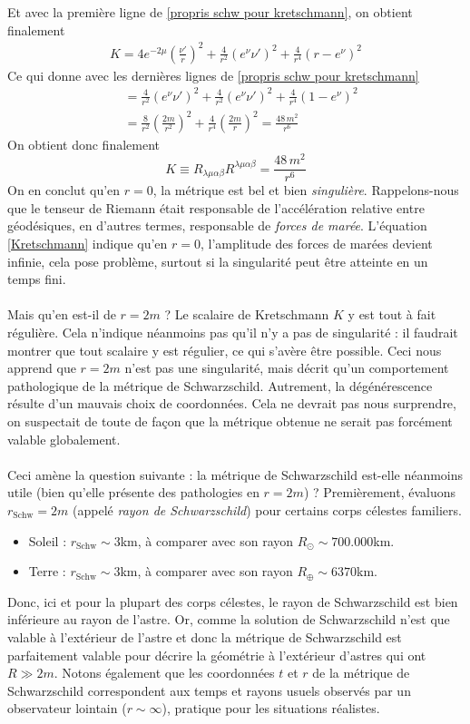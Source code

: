 Et avec la première ligne de \ref{propris schw pour kretschmann}, on obtient finalement
\begin{align*}
    K= 4 e^{-2\mu} \left( \frac{\nu'}{r} \right)^2 + \frac{4}{r^2} (e^{\nu} \nu')^2 + \frac{4}{r^4} (r - e^{\nu})^2
\end{align*}
Ce qui donne avec les dernières lignes de \ref{propris schw pour kretschmann}
\begin{align*}
&= \frac{4}{r^2} \left( e^\nu \nu' \right)^2 + \frac{4}{r^2} (e^{\nu} \nu')^2 + \frac{4}{r^4} (1 - e^\nu)^2 \\
&= \frac{8}{r^2} \left( \frac{2m}{r^2} \right)^2 + \frac{4}{r^4} \left( \frac{2m}{r} \right)^2 = \frac{48 \, m^2}{r^6}
\end{align*}
On obtient donc finalement
\begin{equation}
    \label{Kretschmann}
    \boxed{K \equiv R_{\lambda \mu \alpha \beta} R^{\lambda\mu\alpha\beta} = \frac{48 \, m^2}{r^6}}
\end{equation}
On en conclut qu'en $r = 0$, la métrique est bel et bien \emph{singulière}. Rappelons-nous que le tenseur de Riemann était responsable de l'accélération relative entre géodésiques, en d'autres termes, responsable de \emph{forces de marée}. L'équation \ref{Kretschmann} indique qu'en $r=0$, l'amplitude des forces de marées devient infinie, cela pose problème, surtout si la singularité peut être atteinte en un temps fini.\\
\\
Mais qu'en est-il de $r = 2m$ ? Le scalaire de Kretschmann $K$ y est tout à fait régulière. Cela n'indique néanmoins pas qu'il n'y a pas de singularité : il faudrait montrer que tout scalaire y est régulier, ce qui s'avère être possible. Ceci nous apprend que $r=2m$ n'est pas une singularité, mais décrit qu'un comportement pathologique de la métrique de Schwarzschild. Autrement, la dégénérescence résulte d'un mauvais choix de coordonnées. Cela ne devrait pas nous surprendre, on suspectait de toute de façon que la métrique obtenue ne serait pas forcément valable globalement. \\
\\
Ceci amène la question suivante : la métrique de Schwarzschild est-elle néanmoins utile (bien qu'elle présente des pathologies en $r=2m$) ? Premièrement, évaluons $r_\text{Schw}=2m $ (appelé \emph{rayon de Schwarzschild}) pour certains corps célestes familiers.
\begin{itemize}
    \item Soleil : $r_\text{Schw} \sim 3$km, à comparer avec son rayon $R_\odot \sim 700.000$km.
    \item Terre : $r_\text{Schw} \sim 3$km, à comparer avec son rayon $R_\oplus \sim 6370$km.
\end{itemize}
Donc, ici et pour la plupart des corps célestes, le rayon de Schwarzschild est bien inférieure au rayon de l'astre. Or, comme la solution de Schwarzschild n'est que valable à l'extérieur de l'astre et donc la métrique de Schwarzschild est parfaitement valable pour décrire la géométrie à l'extérieur d'astres qui ont $R \gg 2m$. Notons également que les coordonnées $t$ et $r$ de la métrique de Schwarzschild correspondent aux temps et rayons usuels observés par un observateur lointain ($r \sim \infty$), pratique pour les situations réalistes.
